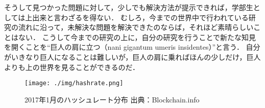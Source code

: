 そうして見つかった問題に対して，少しでも解決方法が提示できれば，学部生としては上出来と言わざるを得ない．
むしろ，今までの世界中で行われている研究の流れに沿って，未解決な問題を解決できたのならば，それほど素晴らしいことはない．
こうして今までの研究の上に，自分の研究を行うことで新たな知見を開くことを``巨人の肩に立つ（nani gigantum umeris insidentes）''と言う．
自分がいきなり巨人になることは難しいが，巨人の肩に乗ればほんの少しだけ，巨人よりも上の世界を見ることができるのだ．

\begin{figure}[h]
    \begin{center}
        \texttt{[image: ./img/hashrate.png]}
        \caption{2017年1月のハッシュレート分布 出典：Blockchain.info\cite{bitcoinhashrate}}
        \label{img:hashrate}
    \end{center}
\end{figure}
\fi
